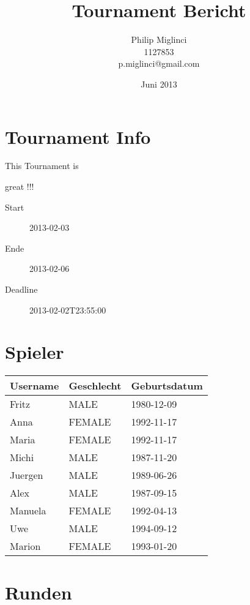 \documentclass{article}
\begin{document}
\title{Tournament Bericht}
\author{Philip Miglinci\\
 1127853\\
 p.miglinci@gmail.com
}
\date{Juni 2013}
\maketitle
    
\section{Tournament Info}
  
        This 
        Tournament is 
        
            great
        !!!
    

\begin{description}
 \item[Start] 2013-02-03
 \item[Ende] 2013-02-06
 \item[Deadline] 2013-02-02T23:55:00
\end{description}
    
\section{Spieler}

\begin{center}
  \begin{table}[h]
      \begin{tabular}{lll}
        \textbf{Username} & \textbf{Geschlecht} & \textbf{Geburtsdatum} \\
        \hline
    Fritz & MALE & 1980-12-09 \\
  Anna & FEMALE & 1992-11-17 \\
  Maria & FEMALE & 1992-11-17 \\
  Michi & MALE & 1987-11-20 \\
  Juergen & MALE & 1989-06-26 \\
  Alex & MALE & 1987-09-15 \\
  Manuela & FEMALE & 1992-04-13 \\
  Uwe & MALE & 1994-09-12 \\
  Marion & FEMALE & 1993-01-20 \\
  
      \end{tabular}
  \end{table}
\end{center}
  
    \section{Runden}
    
\end{document}
